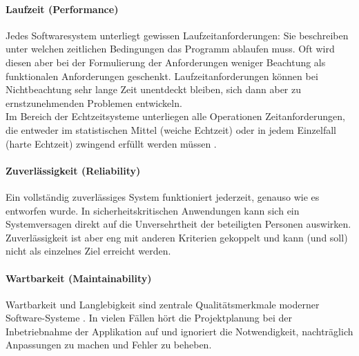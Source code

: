 \paragraph{Laufzeit (Performance)} Jedes Softwaresystem unterliegt gewissen Laufzeitanforderungen: Sie beschreiben unter welchen zeitlichen Bedingungen das Programm ablaufen muss. Oft wird diesen aber bei der Formulierung der Anforderungen weniger Beachtung als funktionalen Anforderungen geschenkt. Laufzeitanforderungen können bei Nichtbeachtung sehr lange Zeit unentdeckt bleiben, sich dann aber zu ernstzunehmenden Problemen entwickeln.\\
Im Bereich der Echtzeitsysteme unterliegen alle Operationen Zeitanforderungen, die entweder im statistischen Mittel (weiche Echtzeit) oder in jedem Einzelfall (harte Echtzeit) zwingend erfüllt werden müssen \cite{hoffmann_software-qualitat_2013}. 

\paragraph{Zuverlässigkeit (Reliability)} Ein vollständig zuverlässiges System funktioniert jederzeit, genauso wie es entworfen wurde. In sicherheitskritischen Anwendungen kann sich ein Systemversagen direkt auf die Unversehrtheit der beteiligten Personen auswirken. Zuverlässigkeit ist aber eng mit anderen Kriterien gekoppelt und kann (und soll) nicht als einzelnes Ziel erreicht werden.

\paragraph{Wartbarkeit (Maintainability)} Wartbarkeit und Langlebigkeit sind zentrale Qualitätsmerkmale moderner Software-Systeme \cite{rombach_design_2009}. In vielen Fällen hört die Projektplanung bei der Inbetriebnahme der Applikation auf und ignoriert die Notwendigkeit, nachträglich Anpassungen zu machen und Fehler zu beheben.

